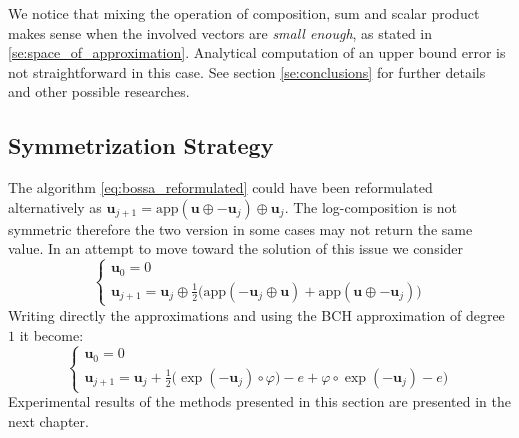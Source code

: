 We notice that mixing the operation of composition, sum and scalar product makes sense when the involved vectors are \emph{small enough}, as stated in \ref{se:space_of_approximation}. 
Analytical computation of an upper bound error is not straightforward in this case. See section \ref{se:conclusions} for further details and other possible researches.

\subsection{Symmetrization Strategy}
The algorithm \ref{eq:bossa_reformulated} could have been reformulated alternatively as $\mathbf{u}_{j+1} =    \text{app}(\mathbf{u} \oplus  - \mathbf{u}_{j}  ) \oplus \mathbf{u}_{j}$. The log-composition is not symmetric therefore the two version in some cases may not return the same value. In an attempt to move toward the solution of this issue we consider
\begin{equation}\label{eq:bossa_symmetric}
\begin{cases}
\mathbf{u}_0 = 0 \\
\mathbf{u}_{j+1} = \mathbf{u}_{j} \oplus 
\frac{1}{2}
\big(  
\text{app}(-\mathbf{u}_{j}  \oplus  \mathbf{u} )
+
\text{app}(\mathbf{u} \oplus  - \mathbf{u}_{j}  )
\big)
\end{cases}
\end{equation}
Writing directly the approximations and using the BCH approximation of degree $1$ it become:
\begin{equation}
\begin{cases}
\mathbf{u}_0 = 0 \\
\mathbf{u}_{j+1} 
=
\mathbf{u}_{j} +  
\frac{1}{2}
\big(  
\exp(-\mathbf{u}_{j}) \circ \varphi ) - e
+
\varphi\circ\exp(-\mathbf{u}_{j}) - e
\big)
\end{cases}
\end{equation}
Experimental results of the methods presented in this section are presented in the next chapter.

